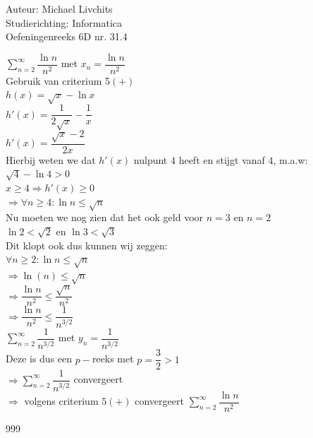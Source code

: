 \documentclass[a4paper]{article}
\begin{document}
  
\noindent \large Auteur: Michael Livchits \\
\noindent \large Studierichting: Informatica\\
\noindent \large Oefeningenreeks 6D nr. 31.4\\

\medskip

\normalsize

$\displaystyle\sum_{n = 2}^{\infty}\dfrac{\ln n}{n^2}$ met $x_n = \dfrac{\ln n}{n^2}$\\

Gebruik van criterium 5$(+)$\\

$h(x)=\sqrt{x}-\ln x $\\

$h'(x)=\dfrac{1}{2\sqrt{x}}-\dfrac{1}{x}$\\

$h'(x)=\dfrac{\sqrt{x}-2}{2x}$\\

Hierbij weten we dat $h'(x)$ nulpunt $4$ heeft en stijgt vanaf $4$, m.a.w:\\

$\sqrt{4}- \ln 4 > 0$\\

$x\ge 4 \Rightarrow h'(x)\ge 0$\\

$\Rightarrow\forall n\ge 4: \ln n\le \sqrt{n}$\\

Nu moeten we nog zien dat het ook geld voor $n=3$ en $n=2$\\

$\ln 2 <\sqrt{2}$ en $\ln 3 <\sqrt{3}$\\

Dit klopt ook dus kunnen wij zeggen:\\

$\forall n\ge 2: \ln n\le \sqrt{n}$\\

$\Rightarrow \ln(n)\le \sqrt{n}$\\

$\Rightarrow \dfrac{\ln n}{n^2}\le \dfrac{\sqrt{n}}{n^2}$\\

$\Rightarrow \dfrac{\ln n}{n^2}\le \dfrac{1}{n^{3/2}}$\\

$\displaystyle\sum_{n=2}^{\infty}\dfrac{1}{n^{3/2}}$ met $y_n = \dfrac{1}{n^{3/2}}$\\

Deze is dus een $p-$reeks met $p= \dfrac{3}{2}> 1$\\

$\Rightarrow \displaystyle\sum_{n=2}^{\infty}\dfrac{1}{n^{3/2}}$ convergeert\\

$\Rightarrow$ volgens criterium $5(+)$ convergeert $\displaystyle\sum_{n=2}^{\infty}\dfrac{\ln n}{n^2}$\\

\begin{thebibliography}{999}
\end{thebibliography}
\end{document}
